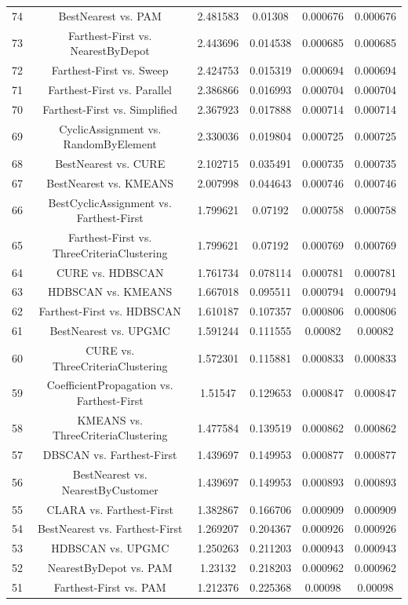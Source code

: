 \documentclass[a4paper,10pt]{article}
\begin{document}
\begin{landscape}
\begin{table}[!htp]
\begin{tabular}{cccccc}
74&BestNearest vs. PAM&2.481583&0.01308&0.000676&0.000676\\
73&Farthest-First vs. NearestByDepot&2.443696&0.014538&0.000685&0.000685\\
72&Farthest-First vs. Sweep&2.424753&0.015319&0.000694&0.000694\\
71&Farthest-First vs. Parallel&2.386866&0.016993&0.000704&0.000704\\
70&Farthest-First vs. Simplified&2.367923&0.017888&0.000714&0.000714\\
69&CyclicAssignment vs. RandomByElement&2.330036&0.019804&0.000725&0.000725\\
68&BestNearest vs. CURE&2.102715&0.035491&0.000735&0.000735\\
67&BestNearest vs. KMEANS&2.007998&0.044643&0.000746&0.000746\\
66&BestCyclicAssignment vs. Farthest-First&1.799621&0.07192&0.000758&0.000758\\
65&Farthest-First vs. ThreeCriteriaClustering&1.799621&0.07192&0.000769&0.000769\\
64&CURE vs. HDBSCAN&1.761734&0.078114&0.000781&0.000781\\
63&HDBSCAN vs. KMEANS&1.667018&0.095511&0.000794&0.000794\\
62&Farthest-First vs. HDBSCAN&1.610187&0.107357&0.000806&0.000806\\
61&BestNearest vs. UPGMC&1.591244&0.111555&0.00082&0.00082\\
60&CURE vs. ThreeCriteriaClustering&1.572301&0.115881&0.000833&0.000833\\
59&CoefficientPropagation vs. Farthest-First&1.51547&0.129653&0.000847&0.000847\\
58&KMEANS vs. ThreeCriteriaClustering&1.477584&0.139519&0.000862&0.000862\\
57&DBSCAN vs. Farthest-First&1.439697&0.149953&0.000877&0.000877\\
56&BestNearest vs. NearestByCustomer&1.439697&0.149953&0.000893&0.000893\\
55&CLARA vs. Farthest-First&1.382867&0.166706&0.000909&0.000909\\
54&BestNearest vs. Farthest-First&1.269207&0.204367&0.000926&0.000926\\
53&HDBSCAN vs. UPGMC&1.250263&0.211203&0.000943&0.000943\\
52&NearestByDepot vs. PAM&1.23132&0.218203&0.000962&0.000962\\
51&Farthest-First vs. PAM&1.212376&0.225368&0.00098&0.00098\\

\end{tabular}
\end{table}
\end{landscape}
\end{document}
